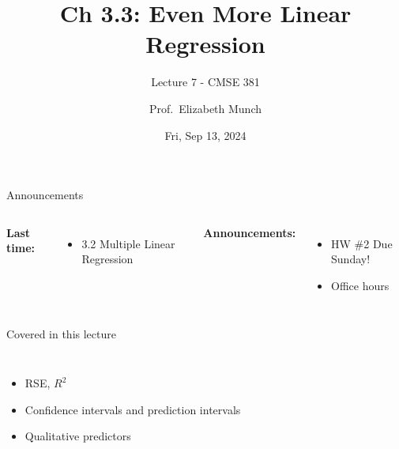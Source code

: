 \documentclass[aspectratio=169,usenames,dvipsnames]{beamer}
\begin{document}
\title[]{Ch 3.3: Even More Linear Regression}
\subtitle{Lecture 7 - CMSE 381}
\date{Fri, Sep 13, 2024}



\author[Dr.~Munch]{Prof.~Elizabeth Munch}

\begin{frame}
 \titlepage


\end{frame}
\begin{frame}[c]{Announcements}

\begin{columns}
\centering

	\textbf{Last time:}
	\begin{itemize}
		\item 3.2 Multiple Linear Regression
	\end{itemize}
\centering

\textbf{Announcements:}
	\begin{itemize}
		\item HW \#2 Due Sunday!
		\item Office hours
	\end{itemize}
\end{columns}

\end{frame}
\begin{frame}[c]{Covered in this lecture }

\begin{columns}
\centering
\begin{itemize}
	\item RSE, $R^2$
	\item Confidence intervals and prediction intervals
	\item Qualitative predictors
\end{itemize}
\centering

\end{columns}

\end{frame}
\end{document}
